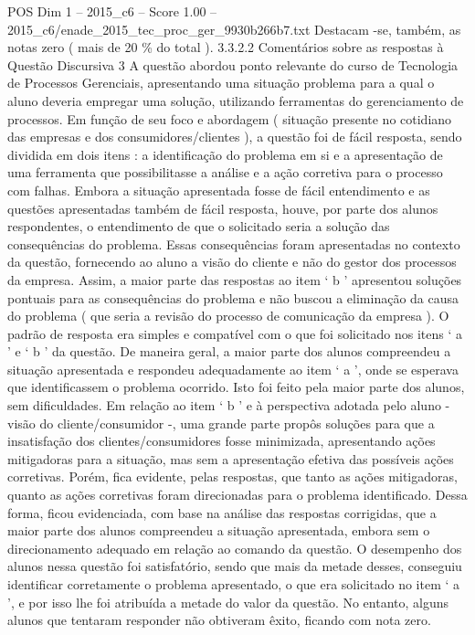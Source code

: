 \begin{textsample}{POS Dim 1 – 2015\_c6 – Score 1.00 – 2015\_c6/enade\_2015\_tec\_proc\_ger\_9930b266b7.txt}
Destacam -se, também, as notas zero ( mais de 20 \% do total ). 3.3.2.2 Comentários sobre as respostas à Questão Discursiva 3 A questão abordou ponto relevante do curso de Tecnologia de Processos Gerenciais, apresentando uma situação problema para a qual o aluno deveria empregar uma solução, utilizando ferramentas do gerenciamento de processos.
Em função de seu foco e abordagem ( situação presente no cotidiano das empresas e dos consumidores/clientes ), a questão foi de fácil resposta, sendo dividida em dois itens : a identificação do problema em si e a apresentação de uma ferramenta que possibilitasse a análise e a ação corretiva para o processo com falhas.
Embora a situação apresentada fosse de fácil entendimento e as questões apresentadas também de fácil resposta, houve, por parte dos alunos respondentes, o entendimento de que o solicitado seria a solução das consequências do problema.
Essas consequências foram apresentadas no contexto da questão, fornecendo ao aluno a visão do cliente e não do gestor dos processos da empresa.
Assim, a maior parte das respostas ao item ‘ b ’ apresentou soluções pontuais para as consequências do problema e não buscou a eliminação da causa do problema ( que seria a revisão do processo de comunicação da empresa ).
O padrão de resposta era simples e compatível com o que foi solicitado nos itens ‘ a ’ e ‘ b ’ da questão.
De maneira geral, a maior parte dos alunos compreendeu a situação apresentada e respondeu adequadamente ao item ‘ a ’, onde se esperava que identificassem o problema ocorrido.
Isto foi feito pela maior parte dos alunos, sem dificuldades.
Em relação ao item ‘ b ’ e à perspectiva adotada pelo aluno - visão do cliente/consumidor -, uma grande parte propôs soluções para que a insatisfação dos clientes/consumidores fosse minimizada, apresentando ações mitigadoras para a situação, mas sem a apresentação efetiva das possíveis ações corretivas.
Porém, fica evidente, pelas respostas, que tanto as ações mitigadoras, quanto as ações corretivas foram direcionadas para o problema identificado.
Dessa forma, ficou evidenciada, com base na análise das respostas corrigidas, que a maior parte dos alunos compreendeu a situação apresentada, embora sem o direcionamento adequado em relação ao comando da questão.
O desempenho dos alunos nessa questão foi satisfatório, sendo que mais da metade desses, conseguiu identificar corretamente o problema apresentado, o que era solicitado no item ‘ a ’, e por isso lhe foi atribuída a metade do valor da questão.
No entanto, alguns alunos que tentaram responder não obtiveram êxito, ficando com nota zero.

\end{textsample}
